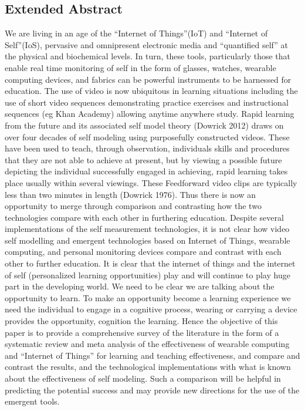 \subsection{Extended Abstract}


We are living in an age of the “Internet of Things”(IoT) and “Internet of Self”(IoS), pervasive and omnipresent electronic media and “quantified self” at the physical and biochemical levels. In turn, these tools, particularly those that enable real time monitoring of self in the form of glasses, watches, wearable computing devices, and fabrics can be powerful instruments to be harnessed for education. 
The use of video is now ubiquitous in learning situations including the use of short video sequences demonstrating practice exercises and instructional sequences (eg Khan Academy) allowing anytime anywhere study. Rapid learning from the future and its associated self model theory (Dowrick 2012) draws on over four decades of self modeling using purposefully constructed videos. These have been used to teach, through observation, individuals skills and procedures that they are not able to achieve at present, but by viewing a possible future depicting the individual successfully engaged in achieving, rapid learning takes place usually within several viewings. These Feedforward video clips are typically less than two minutes in length (Dowrick 1976). Thus there is now an opportunity to merge through comparison and contrasting how the two technologies compare with each other in furthering education.
Despite several implementations of the self measurement technologies, it is not clear how video self modelling and emergent technologies based on Internet of Things, wearable computing, and personal monitoring devices compare and contrast with each other to further education. It is clear that the internet of things and the internet of self (personalized learning opportunities) play and will continue to play huge part in the developing world. We need to be clear we are talking about the opportunity to learn. To make an opportunity become a learning experience we need the individual to engage in a cognitive process, wearing or carrying a device provides the opportunity, cognition the learning. Hence the objective of this paper is to provide a comprehensive survey of the literature in the form of a systematic review and meta analysis of the effectiveness of wearable computing and “Internet of Things” for learning and teaching effectiveness, and compare and contrast the results, and the technological implementations with what is known about the effectiveness of self modeling. Such a comparison will be helpful in predicting the potential success and may provide new directions for the use of the emergent tools.
